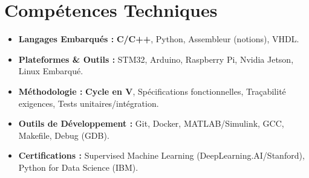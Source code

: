 \documentclass[a4paper,11pt]{article}
\begin{document}
\section{Compétences Techniques}
\begin{itemize}[leftmargin=*, nosep]
    \item \small{\textbf{Langages Embarqués :} \textbf{C/C++}, Python, Assembleur (notions), VHDL.}
    \item \small{\textbf{Plateformes \& Outils :} STM32, Arduino, Raspberry Pi, Nvidia Jetson, Linux Embarqué.}
    \item \small{\textbf{Méthodologie :} \textbf{Cycle en V}, Spécifications fonctionnelles, Traçabilité exigences, Tests unitaires/intégration.}
    \item \small{\textbf{Outils de Développement :} Git, Docker, MATLAB/Simulink, GCC, Makefile, Debug (GDB).}
    \item \small{\textbf{Certifications :} Supervised Machine Learning (DeepLearning.AI/Stanford), Python for Data Science (IBM).}
\end{itemize}

\end{document}
